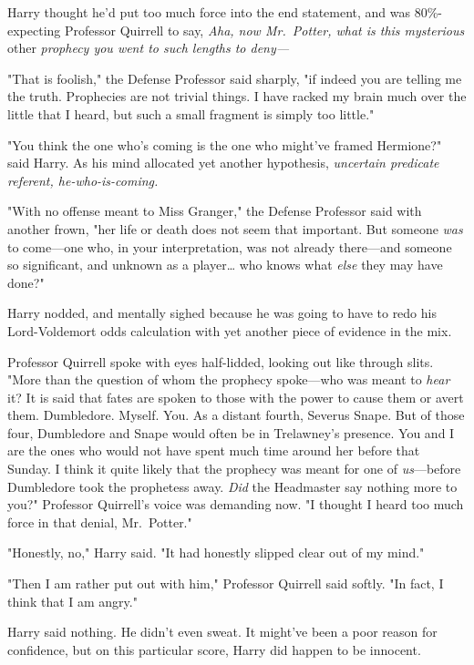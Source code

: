 Harry thought he'd put too much force into the end statement, and was 
80\%-expecting Professor Quirrell to say, \emph{Aha, now Mr.~Potter, what is 
this mysterious} other\emph{ prophecy you went to such lengths to deny---}

"That is foolish," the Defense Professor said sharply, "if indeed you are 
telling me the truth. Prophecies are not trivial things. I have racked my brain 
much over the little that I heard, but such a small fragment is simply too 
little."

"You think the one who's coming is the one who might've framed Hermione?" said 
Harry. As his mind allocated yet another hypothesis, \emph{uncertain predicate 
referent, he-who-is-coming.}

"With no offense meant to Miss Granger," the Defense Professor said with 
another frown, "her life or death does not seem that important. But someone 
\emph{was} to come---one who, in your interpretation, was not already 
there---and someone so significant, and unknown as a player{\ldots} who knows 
what \emph{else} they may have done?"

Harry nodded, and mentally sighed because he was going to have to redo his 
Lord-Voldemort odds calculation with yet another piece of evidence in the mix.

Professor Quirrell spoke with eyes half-lidded, looking out like through slits. 
"More than the question of whom the prophecy spoke---who was meant to 
\emph{hear} it? It is said that fates are spoken to those with the power to 
cause them or avert them. Dumbledore. Myself. You. As a distant fourth, Severus 
Snape. But of those four, Dumbledore and Snape would often be in Trelawney's 
presence. You and I are the ones who would not have spent much time around her 
before that Sunday. I think it quite likely that the prophecy was meant for one 
of \emph{us}---before Dumbledore took the prophetess away. \emph{Did} the 
Headmaster say nothing more to you?" Professor Quirrell's voice was demanding 
now. "I thought I heard too much force in that denial, Mr.~Potter."

"Honestly, no," Harry said. "It had honestly slipped clear out of my mind."

"Then I am rather put out with him," Professor Quirrell said softly. "In fact, 
I think that I am angry."

Harry said nothing. He didn't even sweat. It might've been a poor reason for 
confidence, but on this particular score, Harry did happen to be innocent.

